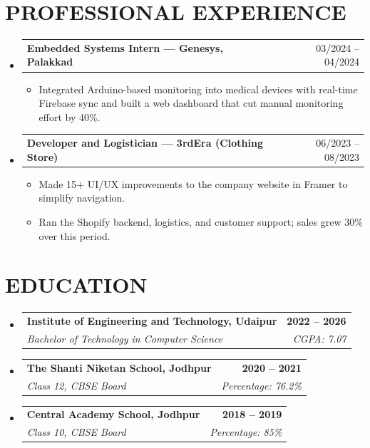 \documentclass[letterpaper,10pt]{article}
\makeatletter
\newcommand{\edu}[4]{\vspace{3pt}\item
  \begin{tabular*}{\textwidth}[t]{l@{\extracolsep{\fill}}r}
    \textbf{\normalsize #1} & \textbf{#2} \\
    \textit{#3} & \textit{\small #4} \\
  \end{tabular*}\vspace{-6pt}}
\newcommand{\job}[2]{\vspace{2pt}\item
  \begin{tabular*}{\textwidth}[t]{l@{\extracolsep{\fill}}r}
    \textbf{#1} & #2 \\
  \end{tabular*}\vspace{-6pt}}
\newcommand{\bul}[1]{\item\small{#1\vspace{-2pt}}}
\newcommand{\listStart}{\begin{itemize}[leftmargin=0in, label={}]}
\newcommand{\listEnd}{\end{itemize}}
\newcommand{\bulStart}{\begin{itemize}[leftmargin=0.25in, label=$\bullet$]}
\newcommand{\bulEnd}{\end{itemize}\vspace{-4pt}}
\makeatother
\begin{document}
\section{PROFESSIONAL EXPERIENCE}
\listStart
  \job{Embedded Systems Intern --- Genesys, Palakkad}{03/2024 -- 04/2024}
  \bulStart
    \bul{Integrated Arduino-based monitoring into medical devices with real-time Firebase sync and built a web dashboard that cut manual monitoring effort by 40\%.}
  \bulEnd
  \job{Developer and Logistician --- 3rdEra (Clothing Store)}{06/2023 -- 08/2023}
  \bulStart
    \bul{Made 15+ UI/UX improvements to the company website in Framer to simplify navigation.}
    \bul{Ran the Shopify backend, logistics, and customer support; sales grew 30\% over this period.}
  \bulEnd
\listEnd

\section{EDUCATION}
\listStart
  \edu{Institute of Engineering and Technology, Udaipur}{2022 -- 2026}{Bachelor of Technology in Computer Science}{CGPA: 7.07}
  \edu{The Shanti Niketan School, Jodhpur}{2020 -- 2021}{Class 12, CBSE Board}{Percentage: 76.2\%}
  \edu{Central Academy School, Jodhpur}{2018 -- 2019}{Class 10, CBSE Board}{Percentage: 85\%}
\listEnd
\vspace{-4pt}
\end{document}
